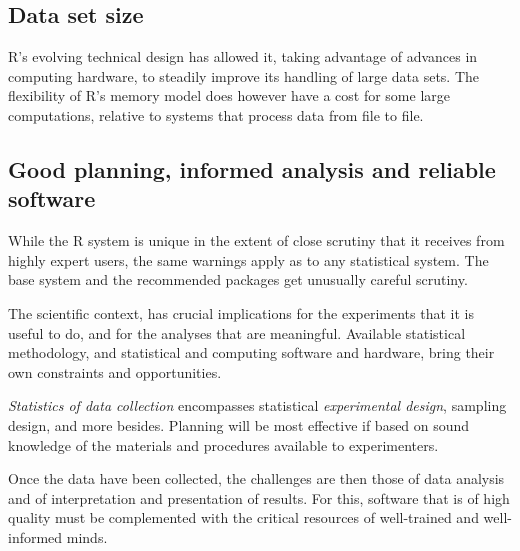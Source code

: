 \subsection*{Data set size}
R's evolving technical design has allowed it, taking advantage of advances in computing hardware,
to steadily improve its handling of large data sets. The flexibility
of R's memory model does however have a cost for some large computations, relative to systems
that process data from file to file.

\subsection*{Good planning,  informed analysis and reliable software}

While the R system
is unique in the extent of close scrutiny that it
receives from highly expert users, the same warnings apply as to any
statistical system.  The base system and the recommended
  packages get unusually careful scrutiny.

  The scientific context, has crucial implications for the experiments
  that it is useful to do, and for the analyses that are meaningful.
  Available statistical methodology, and statistical and computing
  software and hardware, bring their own constraints and opportunities.

\textit{Statistics of data collection}  encompasses statistical
\textit{experimental design}, sampling design, and more besides.
Planning will be most effective if based on sound knowledge of the
materials and procedures available to experimenters.

Once the data have been collected, the challenges are then those of
data analysis and of interpretation and presentation of results. For
this, software that is of high quality must be complemented with the
critical resources of well-trained and well-informed minds.

